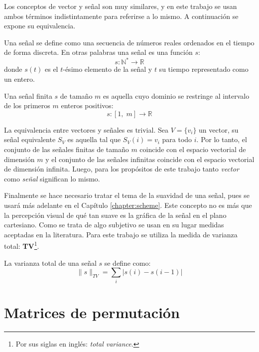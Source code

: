 Los conceptos de vector y señal son muy similares, y en este trabajo se usan ambos t\'erminos indistintamente para referirse a lo mismo. A continuaci\'on se expone su equivalencia.
\begin{definition}
	Una señal se define como una secuencia de n\'umeros reales ordenados en el tiempo de forma discreta. En otras palabras una señal es una función $s$:
	\begin{equation}
		s : \mathbb{N}^\ast \rightarrow \mathbb{R}
	\end{equation}
	donde $s(t)$ es el $t$-\'esimo elemento de la señal y $t$ su tiempo representado como un entero. 
\end{definition}
\begin{definition}
	Una señal finita $s$ de tamaño $m$ es aquella cuyo dominio se restringe al intervalo de los primeros $m$ enteros positivos:
	\begin{equation}
		s : [1,\;m] \rightarrow \mathbb{R}
	\end{equation}
\end{definition}
La equivalencia entre vectores y señales es trivial. Sea $V = \{v_i\}$ un vector, su señal equivalente $S_V$ es aquella tal que $S_V(i) = v_i$ para todo $i$. Por lo tanto, el conjunto de las señales finitas de tamaño $m$ coincide con el espacio vectorial de dimensi\'on $m$ y el conjunto de las señales infinitas coincide con el espacio vectorial de dimensi\'on infinita. Luego, para los prop\'ositos de este trabajo tanto \textit{vector} como \textit{señal} significan lo mismo.

Finalmente se hace necesario tratar el tema de la suavidad de una señal, pues se usar\'a m\'as adelante en el Cap\'itulo \ref{chapter:scheme}. Este concepto no es m\'as que la percepci\'on visual de qu\'e tan suave es la gr\'afica de la señal en el plano cartesiano. Como se trata de algo subjetivo se usan en su lugar medidas aceptadas en la literatura. Para este trabajo se utiliza la medida de varianza total: \textbf{TV}\footnote{Por sus siglas en ingl\'es: \textit{total variance}.}.
\begin{definition}\label{def:tv}
	La varianza total de una señal $s$ se define como:
	\begin{equation}
		\|s\|_{TV} = \sum_{i}|s(i) - s(i - 1)|
	\end{equation}
\end{definition}

\section{Matrices de permutaci\'on}\label{sec:permutation_matrices}

